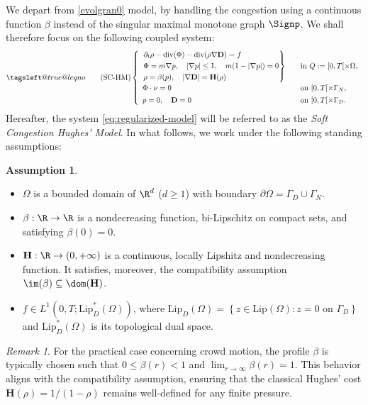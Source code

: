 \documentclass[final,reqno]{amsart}
\makeatletter
\theoremstyle{plain}
\theoremstyle{definition}
\newtheorem{assumption}{Assumption}	%
\theoremstyle{remark}
\newtheorem{remark}{Remark}	%
\numberwithin{remark}{section}	%
\numberwithin{example}{section}	%
\DeclareMathOperator{\dive}{div}
\newcommand{\de}{\mathbf{D}}
\newcommand{\he}{\mathbf{H}}
\newcommand{\Om}{\Omega}
\newcommand{\leqnomode}{\tagsleft@true\let\veqno\@@leqno}
\makeatother
\begin{document}
We depart from \eqref{evolgran0} model, by handling the congestion using a continuous function $\beta$ instead of the singular maximal monotone graph $\Signp$. 
We shall therefore focus on the following coupled system:
\begin{equation}\leqnomode
    \tag{SC-HM}
    \label{eq:regularized-model}
    \left\{
    \begin{array}{ll}
        \left. \begin{aligned}
            &\partial_t \rho -\dive (\Phi) -\dive(\rho \nabla \de) = f \\
            &\Phi=m \nabla p, \quad \vert \nabla p\vert \leq 1, \quad m(1-\vert \nabla p\vert)=0\\
            &\rho=\beta (p), \quad \vert \nabla \de \vert=\he(\rho)
        \end{aligned} \right\} \quad & \text{in } Q := [0,T[ \times \Omega, \\[4ex]
        \Phi \cdot \nu = 0 & \text{on } [0,T[ \times\Gamma_N, \\[1ex]
        p = 0, \quad \de = 0 & \text{on } [0,T[ \times\Gamma_D.
    \end{array}
    \right.
\end{equation}
Hereafter, the system \eqref{eq:regularized-model} will be referred to as the \emph{Soft Congestion Hughes' Model}. In what follows, we work under the following standing assumptions:
\begin{assumption}\label{assumption:1}
\begin{itemize}
        \item $\Om$ is a bounded domain of $\R^d$ ($d \geq 1$) with boundary $\partial \Om = \Gamma_D \cup \Gamma_N$.
        \item $\beta:\R \to \R$ is a nondecreasing function, bi-Lipschitz on compact sets, and satisfying $\beta(0)=0$.
        \item $\he: \R \to (0,+\infty)$ is a continuous, locally Lipshitz and nondecreasing function. It satisfies, moreover, the compatibility assumption $\im(\beta)\subseteq \dom(\he)$.
  \item $f \in L^1(0,T;\text{Lip}_D^*(\Omega))$, where $\text{Lip}_D(\Omega) = \left\{ z \in \text{Lip}(\Omega) : z=0 \text{ on } \Gamma_D \right\}$ and $\text{Lip}_D^*(\Omega)$ is its topological dual space.
\end{itemize}
\end{assumption}


 
\begin{remark}
    For the practical case concerning crowd motion, the profile $\beta$ is typically chosen such that $0\leq \beta(r)<1$ and $\lim_{r\to\infty} \beta(r)=1$. This behavior aligns with the compatibility assumption, ensuring that the classical Hughes' cost $\he(\rho) = 1/(1-\rho)$ remains well-defined for any finite pressure.
\end{remark}
\end{document}
